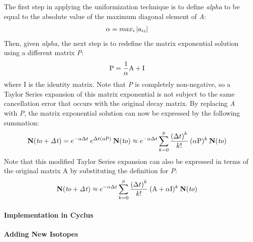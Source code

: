 \documentclass[letterpaper,10pt,english]{sphinxmanual}
\begin{document}
The first step in applying the uniformization technique is to define
\emph{alpha} to be equal to the absolute value of the maximum diagonal
element of \emph{A}:
\begin{gather}
\begin{split}\alpha=max_i\left | {a_i}_i \right |\end{split}\notag
\end{gather}
Then, given \emph{alpha}, the next step is to redefine the matrix
exponential solution using a different matrix \emph{P}:
\begin{gather}
\begin{split}\textrm{P}=\frac{1}{\alpha}\textrm{A}+\textrm{I}\end{split}\notag
\end{gather}
where I is the identity matrix.  Note that \emph{P} is completely non-negative, so a
Taylor Series expansion of this matrix exponential is not subject to the same
cancellation error that occurs with the original decay matrix.  By replacing \emph{A}
with \emph{P}, the matrix exponential solution can now be expressed by the following
summation:
\begin{gather}
\begin{split}\mathbf{N(\mathit{to+\Delta t})}=e^{-\alpha \Delta t}\: e^{\Delta t (\alpha \textrm{P})}\: \mathbf{N(\mathit{to})}\approx e^{-\alpha \Delta t}\sum_{k=0}^{p}\frac{\left (\Delta t \right )^k}{k!}\: (\alpha \textrm{P})^k\: \mathbf{N(\mathit{to})}\end{split}\notag
\end{gather}
Note that this modified Taylor Series expansion can also be expressed in terms
of the original matrix A by substituting the definition for \emph{P}:
\begin{gather}
\begin{split}\mathbf{N(\mathit{to+\Delta t})}\approx e^{-\alpha\Delta t}\sum_{k=0}^{p}\frac{\left (\Delta t \right )^k}{k!}\: (\textrm{A}+\alpha \textrm{I})^k\: \mathbf{N(\mathit{to})}\end{split}\notag
\end{gather}

\paragraph{Implementation in Cyclus}
\label{devdoc/decay:implementation-in-cyclus}

\paragraph{Adding New Isotopes}
\label{devdoc/decay:adding-new-isotopes}
\end{document}
